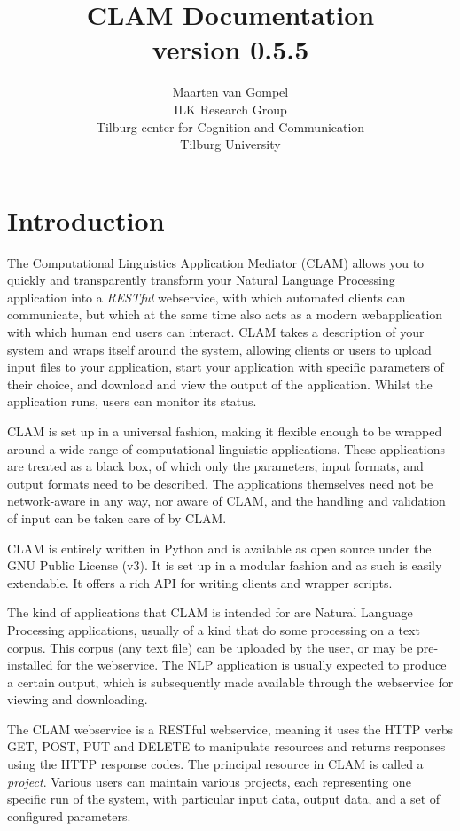 \documentclass[a4paper,12pt]{report}
\title{CLAM Documentation \\ \small version 0.5.5}
\author{Maarten van Gompel \\ ILK Research Group \\ Tilburg center for Cognition and Communication \\ Tilburg University }
\begin{document}
\sffamily

\maketitle
\tableofcontents

\chapter{Introduction} 

The Computational Linguistics Application Mediator (CLAM) allows you to quickly and transparently transform your Natural Language Processing application into a \emph{RESTful}\/ webservice, with which automated clients can communicate, but which at the same time also acts as a modern webapplication with which human end users can interact. CLAM takes a description of your system and wraps itself around the system, allowing clients or users to upload input files to your application, start your application with specific parameters of their choice, and download and view the output of the application. Whilst the application runs, users can monitor its status.

CLAM is set up in a universal fashion, making it flexible enough to be wrapped around a wide range of computational linguistic applications. These applications are treated as a black box, of which only the parameters, input formats, and output formats need to be described. The applications themselves need not be network-aware in any way, nor aware of CLAM, and the handling and validation of input can be taken care of by CLAM.

CLAM is entirely written in Python and is available as open source under the GNU Public License (v3). It is set up in a modular fashion and as such is easily extendable. It offers a rich API for writing clients and wrapper scripts.

The kind of applications that CLAM is intended for are Natural Language Processing applications, usually of a kind that do some processing on a text corpus. This corpus (any text file) can be uploaded by the user, or may be pre-installed for the webservice. The NLP application is usually expected to produce a certain output, which is subsequently made available through the webservice for viewing and downloading.

The CLAM webservice is a RESTful webservice, meaning it uses the HTTP verbs GET, POST, PUT and DELETE to manipulate resources and returns responses using the HTTP response codes. The principal resource in CLAM is called a \emph{project}. Various users can maintain various projects, each representing one specific run of the system, with particular input data, output data, and a set of configured parameters.
\end{document}
